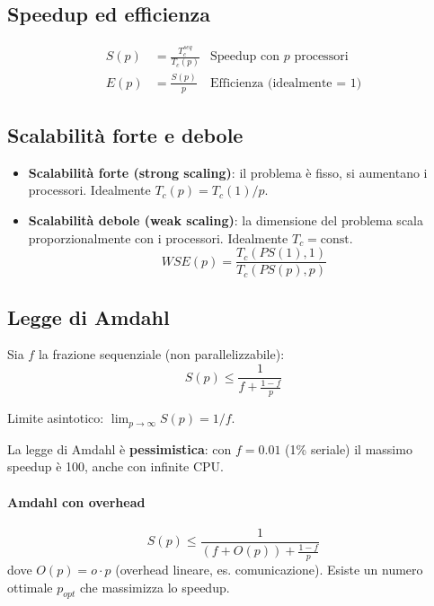 \documentclass[11pt,a4paper]{article}
\theoremstyle{remark}
\begin{document}
\subsection{Speedup ed efficienza}

\begin{align}
  S(p) &= \frac{T_c^{seq}}{T_c(p)} & \text{Speedup con $p$ processori} \\
  E(p) &= \frac{S(p)}{p} & \text{Efficienza (idealmente = 1)}
\end{align}

\subsection{Scalabilità forte e debole}

\begin{itemize}
  \item \textbf{Scalabilità forte (strong scaling)}: il problema è fisso, si aumentano i processori. Idealmente $T_c(p) = T_c(1)/p$.
  \item \textbf{Scalabilità debole (weak scaling)}: la dimensione del problema scala proporzionalmente con i processori. Idealmente $T_c = \text{const}$.
    \[
      WSE(p) = \frac{T_c(PS(1),1)}{T_c(PS(p),p)}
    \]
\end{itemize}

\subsection{Legge di Amdahl}

Sia $f$ la frazione sequenziale (non parallelizzabile):
\begin{equation}
  \boxed{S(p) \leq \frac{1}{f + \frac{1-f}{p}}}
\end{equation}

Limite asintotico: $\lim_{p\to\infty} S(p) = 1/f$.

La legge di Amdahl è \textbf{pessimistica}: con $f=0.01$ (1\% seriale) il massimo speedup è 100, anche con infinite CPU.

\paragraph{Amdahl con overhead}
\begin{equation}
  S(p) \leq \frac{1}{(f + O(p)) + \frac{1-f}{p}}
\end{equation}
dove $O(p) = o \cdot p$ (overhead lineare, es. comunicazione). Esiste un numero ottimale $p_{opt}$ che massimizza lo speedup.
\end{document}
